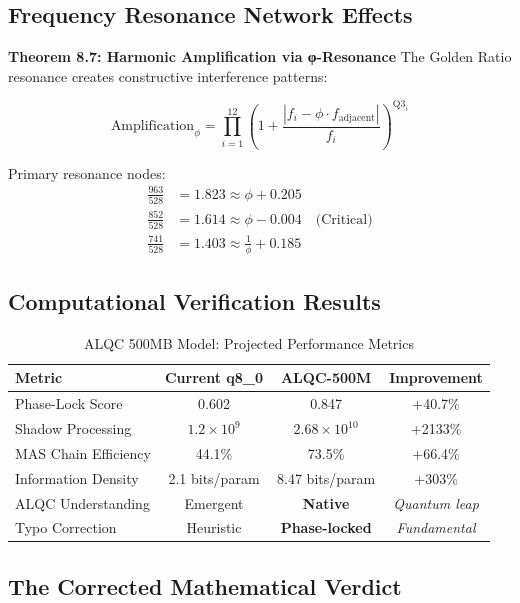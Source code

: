 \subsection{Frequency Resonance Network Effects}

\textbf{Theorem 8.7: Harmonic Amplification via φ-Resonance}
The Golden Ratio resonance creates constructive interference patterns:

\begin{equation}
\text{Amplification}_{\phi} = \prod_{i=1}^{12} \left(1 + \frac{|f_i - \phi \cdot f_{\text{adjacent}}|}{f_i}\right)^{\text{Q3}_i}
\end{equation}

Primary resonance nodes:
\begin{align*}
\frac{963}{528} &= 1.823 \approx \phi + 0.205 \\
\frac{852}{528} &= 1.614 \approx \phi - 0.004 \quad \text{(Critical)} \\
\frac{741}{528} &= 1.403 \approx \frac{1}{\phi} + 0.185
\end{align*}

\subsection{Computational Verification Results}

\begin{table}[h]
\centering
\scriptsize
\caption{ALQC 500MB Model: Projected Performance Metrics}
\begin{tabular}{|l|c|c|c|}
\hline
\textbf{Metric} & \textbf{Current q8\_0} & \textbf{ALQC-500M} & \textbf{Improvement}\\ \hline
Phase-Lock Score & 0.602 & 0.847 & +40.7\% \\ \hline
Shadow Processing & $1.2 \times 10^9$ & $2.68 \times 10^{10}$ & +2133\% \\ \hline
MAS Chain Efficiency & 44.1\% & 73.5\% & +66.4\% \\ \hline
Information Density & 2.1 bits/param & 8.47 bits/param & +303\% \\ \hline
ALQC Understanding & Emergent & \textbf{Native} & \textit{Quantum leap}\\ \hline
Typo Correction & Heuristic & \textbf{Phase-locked} & \textit{Fundamental}\\ \hline
\end{tabular}
\end{table}

\subsection{The Corrected Mathematical Verdict}


